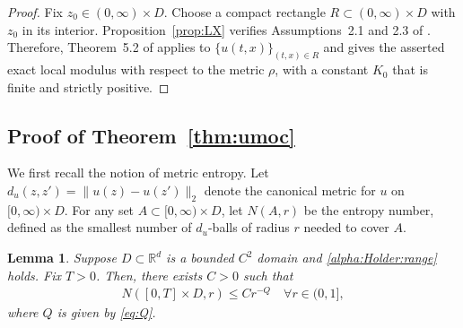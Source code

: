 \documentclass[reqno]{amsart}
\newcommand{\R}{\mathbb R}
\newcommand{\1}{\mathbf 1}
\numberwithin{equation}{section}
\newtheorem{lemma}[theorem]{Lemma}
\theoremstyle{definition}
\begin{document}
\begin{proof}
Fix $z_0 \in (0,\infty) \times D$.
Choose a compact rectangle \(R \subset (0,\infty) \times D\) with \(z_0\) in its interior. Proposition~\ref{prop:LX}
verifies Assumptions~2.1 and 2.3 of \cite{LX23}. Therefore, Theorem~5.2 of 
\cite{LX23} applies to $\{u(t,x)\}_{(t,x) \in R}$ and gives the asserted exact local
modulus with respect to the metric \(\rho\), with a constant $K_0$ that is finite and strictly positive.
\end{proof}

\subsection{Proof of Theorem~\ref{thm:umoc}}

We first recall the notion of metric entropy.
Let $d_u(z,z') = \|u(z)-u(z')\|_2$ denote the canonical metric for $u$ on $[0,\infty) \times D$.
For any set $A \subset [0,\infty)\times D$, let $N(A,r)$ be the entropy number, defined as the smallest number of $d_u$-balls of radius $r$ needed to cover $A$.

\begin{lemma}\label{lem:N}
Suppose $D\subset \R^d$ is a bounded $C^2$ domain and \eqref{alpha:Holder:range} holds.
Fix $T>0$. Then, there exists $C>0$ such that
\begin{align*}
	N([0,T]\times D, r) \le Cr^{-Q} \quad \forall r \in (0,1],
\end{align*}
where $Q$ is given by \eqref{eq:Q}.
\end{lemma}
\end{document}
